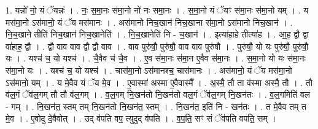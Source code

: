\documentclass[17pt]{extarticle}
\begin{document}
1. यन्नो॑ नो॒ यं ॅयन्नः॑ । . नः॒ स॒मा॒नः स॑मा॒नो नो॑ नः समा॒नः । . स॒मा॒नो यं ॅयꣳ स॑मा॒नः स॑मा॒नो यम् । . य मस॑मा॒नो ऽस॑मानो॒ यं ॅय मस॑मानः । . अस॑मानो निच॒खान॑ निच॒खाना स॑मा॒नो ऽस॑मानो निच॒खान॑ । . नि॒च॒खाने तीति॑ निच॒खान॑ निच॒खानेति॑ । . नि॒च॒खानेति॑ नि - च॒खान॑ । . इत्या॑हा॒हे तीत्या॑ह । . आ॒ह॒ द्वौ द्वा वा॑हाह॒ द्वौ । . द्वौ वाव वाव द्वौ द्वौ वाव । . वाव पुरु॑षौ॒ पुरु॑षौ॒ वाव वाव पुरु॑षौ । . पुरु॑षौ॒ यो यः पुरु॑षौ॒ पुरु॑षौ॒ यः । . यश्च॑ च॒ यो यश्च॑ । . चै॒वैव च॑ चै॒व । . ए॒व स॑मा॒नः स॑मा॒न ए॒वैव स॑मा॒नः । . स॒मा॒नो यो यः स॑मा॒नः स॑मा॒नो यः । . यश्च॑ च॒ यो यश्च॑ । . चास॑मा॒नो ऽस॑मानश्च॒ चास॑मानः । . अस॑मानो॒ यं ॅय मस॑मा॒नो ऽस॑मानो॒ यम् । . य मे॒वैव यं ॅय मे॒व । . ए॒वास्मा॑ अस्मा ए॒वैवास्मै᳚ । . अ॒स्मै॒ तौ ता व॑स्मा अस्मै॒ तौ । . तौ व॑ल॒गं ॅव॑ल॒गम् तौ तौ व॑ल॒गम् । . व॒ल॒गम् नि॒खन॑तो नि॒खन॑तो वल॒गं ॅव॑ल॒गम् नि॒खन॑तः । . व॒ल॒गमिति॑ वल - गम् । . नि॒खन॑त॒ स्तम् तम् नि॒खन॑तो नि॒खन॑त॒ स्तम् । . नि॒खन॑त॒ इति॑ नि - खन॑तः । . त मे॒वैव तम् त मे॒व । . ए॒वोदु दे॒वैवोत् । . उद् व॑पति वप॒ त्युदुद् व॑पति । . व॒प॒ति॒ सꣳ सं ॅव॑पति वपति॒ सम् । \newline
\end{document}
